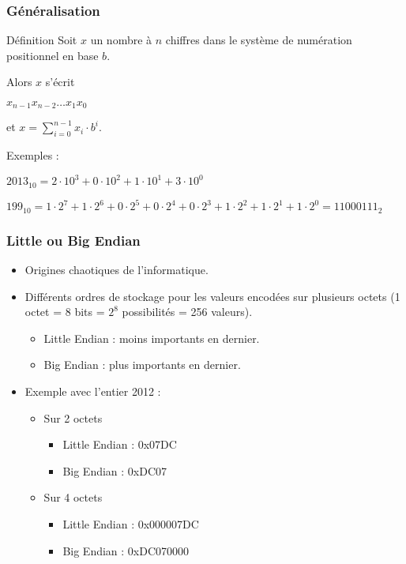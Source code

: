 	\frame
	{
		\frametitle{G\'en\'eralisation}
		\begin{block}{D\'efinition}
			Soit $x$ un nombre \`a $n$ chiffres dans le syst\`eme de num\'eration positionnel en base $b$.
			
			Alors $x$ s'\'ecrit
			
			$x_{n-1}x_{n-2}\ldots x_1x_0$
			
			et $x=\sum\limits_{i = 0}^{n-1}x_i\cdot b^i$.
		\end{block}
		
		Exemples :
		\begin{description}
			\item<2-> $2013_{10} = 2\cdot10^3 + 0\cdot10^2 + 1\cdot10^1+3\cdot10^0$
			\item<3-> $199_{10} = 1\cdot2^7 + 1\cdot2^6 + 0\cdot2^5+0\cdot2^4 + 0\cdot2^3 + 1\cdot2^2 + 1\cdot2^1+1\cdot2^0 = 11000111_2$
		\end{description}
	}

\frame
{
	\frametitle{Little ou Big Endian}
	\begin{itemize}
		\item<2-> Origines chaotiques de l'informatique.
		\item<3-> Diff\'erents ordres de stockage pour les valeurs encod\'ees sur plusieurs octets (1 octet = 8 bits = $2^8$ possibilit\'es = 256 valeurs).
		\begin{itemize}
			\item<4-> Little Endian : moins importants en dernier.
			\item<5-> Big Endian : plus importants en dernier.
		\end{itemize}
		\item<6-> Exemple avec l'entier 2012 :
		\begin{itemize}
			\item<7-> Sur 2 octets
			\begin{itemize}
				\item<8-> Little Endian : 0x07DC
				\item<9-> Big Endian : 0xDC07
			\end{itemize}
			\item<10-> Sur 4 octets
			\begin{itemize}
				\item<11-> Little Endian : 0x000007DC
				\item<12-> Big Endian : 0xDC070000
			\end{itemize}
		\end{itemize}
	\end{itemize}
}
